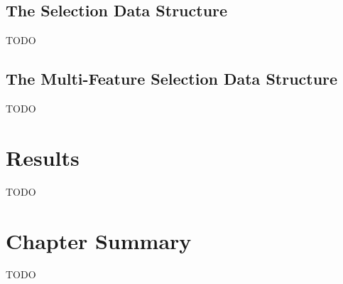 \subsection{The Selection Data Structure}

TODO

\subsection{The Multi-Feature Selection Data Structure}

TODO

\section{Results}

TODO

\section{Chapter Summary}

TODO
